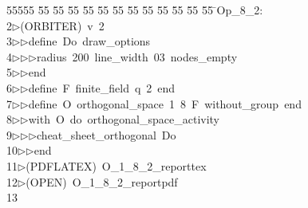 %
%
\begin{tabbing}
55555 \= 55 \= 55 \= 55 \= 55 \= 55 \= 55 \= 55 \= 55 \= 55 \= 55 \= 55 \= 55 \= \>Op\_8\_2:\\[0pt]
2\>$\triangleright$\>(ORBITER)\ v\ 2\ \\[0pt]
3\>$\triangleright$\>$\triangleright$\>define\ Do\ draw\_options\ \\[0pt]
4\>$\triangleright$\>$\triangleright$\>$\triangleright$\>radius\ 200\ line\_width\ 03\ nodes\_empty\ \\[0pt]
5\>$\triangleright$\>$\triangleright$\>end\ \\[0pt]
6\>$\triangleright$\>$\triangleright$\>define\ F\ finite\_field\ q\ 2\ end\ \\[0pt]
7\>$\triangleright$\>$\triangleright$\>define\ O\ orthogonal\_space\ 1\ 8\ F\ without\_group\ end\ \\[0pt]
8\>$\triangleright$\>$\triangleright$\>with\ O\ do\ orthogonal\_space\_activity\ \\[0pt]
9\>$\triangleright$\>$\triangleright$\>$\triangleright$\>cheat\_sheet\_orthogonal\ Do\ \\[0pt]
10\>$\triangleright$\>$\triangleright$\>end\\[0pt]
11\>$\triangleright$\>(PDFLATEX)\ O\_1\_8\_2\_reporttex\ \\[0pt]
12\>$\triangleright$\>(OPEN)\ O\_1\_8\_2\_reportpdf\\[0pt]
13\>\end{tabbing}
